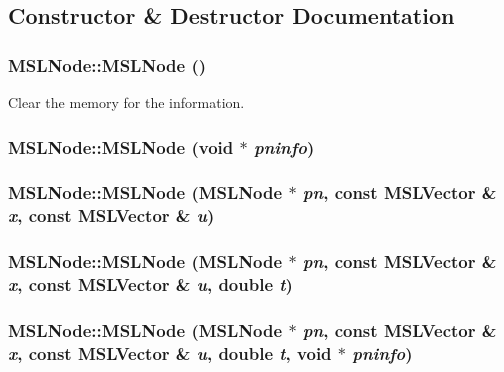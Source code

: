 \subsection{Constructor \& Destructor Documentation}
\subsubsection{\setlength{\rightskip}{0pt plus 5cm}MSLNode::MSLNode ()}\label{classMSLNode_a11}


Clear the memory for the information.

\subsubsection{\setlength{\rightskip}{0pt plus 5cm}MSLNode::MSLNode (void $\ast$ {\em pninfo})}\label{classMSLNode_a12}


\subsubsection{\setlength{\rightskip}{0pt plus 5cm}MSLNode::MSLNode (MSLNode $\ast$ {\em pn}, const {\bf MSLVector} \& {\em x}, const {\bf MSLVector} \& {\em u})}\label{classMSLNode_a13}


\subsubsection{\setlength{\rightskip}{0pt plus 5cm}MSLNode::MSLNode (MSLNode $\ast$ {\em pn}, const {\bf MSLVector} \& {\em x}, const {\bf MSLVector} \& {\em u}, double {\em t})}\label{classMSLNode_a14}


\subsubsection{\setlength{\rightskip}{0pt plus 5cm}MSLNode::MSLNode (MSLNode $\ast$ {\em pn}, const {\bf MSLVector} \& {\em x}, const {\bf MSLVector} \& {\em u}, double {\em t}, void $\ast$ {\em pninfo})}\label{classMSLNode_a15}


